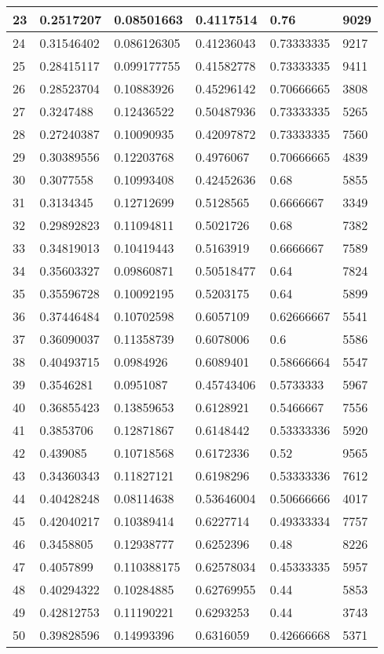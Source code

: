 \begin{longtable}{|l|l|l|l|l|l|}
23 & 0.2517207 & 0.08501663 & 0.4117514 & 0.76 & 9029 \\ \hline 
24 & 0.31546402 & 0.086126305 & 0.41236043 & 0.73333335 & 9217 \\ \hline 
25 & 0.28415117 & 0.099177755 & 0.41582778 & 0.73333335 & 9411 \\ \hline 
26 & 0.28523704 & 0.10883926 & 0.45296142 & 0.70666665 & 3808 \\ \hline 
27 & 0.3247488 & 0.12436522 & 0.50487936 & 0.73333335 & 5265 \\ \hline 
28 & 0.27240387 & 0.10090935 & 0.42097872 & 0.73333335 & 7560 \\ \hline 
29 & 0.30389556 & 0.12203768 & 0.4976067 & 0.70666665 & 4839 \\ \hline 
30 & 0.3077558 & 0.10993408 & 0.42452636 & 0.68 & 5855 \\ \hline 
31 & 0.3134345 & 0.12712699 & 0.5128565 & 0.6666667 & 3349 \\ \hline 
32 & 0.29892823 & 0.11094811 & 0.5021726 & 0.68 & 7382 \\ \hline 
33 & 0.34819013 & 0.10419443 & 0.5163919 & 0.6666667 & 7589 \\ \hline 
34 & 0.35603327 & 0.09860871 & 0.50518477 & 0.64 & 7824 \\ \hline 
35 & 0.35596728 & 0.10092195 & 0.5203175 & 0.64 & 5899 \\ \hline 
36 & 0.37446484 & 0.10702598 & 0.6057109 & 0.62666667 & 5541 \\ \hline 
37 & 0.36090037 & 0.11358739 & 0.6078006 & 0.6 & 5586 \\ \hline 
38 & 0.40493715 & 0.0984926 & 0.6089401 & 0.58666664 & 5547 \\ \hline 
39 & 0.3546281 & 0.0951087 & 0.45743406 & 0.5733333 & 5967 \\ \hline 
40 & 0.36855423 & 0.13859653 & 0.6128921 & 0.5466667 & 7556 \\ \hline 
41 & 0.3853706 & 0.12871867 & 0.6148442 & 0.53333336 & 5920 \\ \hline 
42 & 0.439085 & 0.10718568 & 0.6172336 & 0.52 & 9565 \\ \hline 
43 & 0.34360343 & 0.11827121 & 0.6198296 & 0.53333336 & 7612 \\ \hline 
44 & 0.40428248 & 0.08114638 & 0.53646004 & 0.50666666 & 4017 \\ \hline 
45 & 0.42040217 & 0.10389414 & 0.6227714 & 0.49333334 & 7757 \\ \hline 
46 & 0.3458805 & 0.12938777 & 0.6252396 & 0.48 & 8226 \\ \hline 
47 & 0.4057899 & 0.110388175 & 0.62578034 & 0.45333335 & 5957 \\ \hline 
48 & 0.40294322 & 0.10284885 & 0.62769955 & 0.44 & 5853 \\ \hline 
49 & 0.42812753 & 0.11190221 & 0.6293253 & 0.44 & 3743 \\ \hline 
50 & 0.39828596 & 0.14993396 & 0.6316059 & 0.42666668 & 5371 \\ \hline 
\end{longtable}